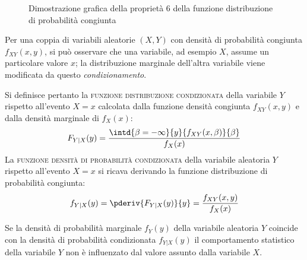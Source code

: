 \begin{figure}[!ht]
{\begin{tikzpicture}[scale=.6]
		\end{tikzpicture}
	} \hspace{3em}
	\caption{Dimostrazione grafica della proprietà 6 della funzione distribuzione di probabilità congiunta}
\end{figure}

Per una coppia di variabili aleatorie $(X,Y)$ con densità di probabilità congiunta $f_{XY}(x,y)$, si può osservare che una variabile, ad esempio $X$, assume un particolare valore $x$; la distribuzione marginale dell'altra variabile viene modificata da questo \emph{condizionamento}.

Si definisce pertanto la \textsc{funzione distribuzione condizionata} della variabile $Y$ rispetto all'evento $X=x$ calcolata dalla funzione densità congiunta $f_{XY}(x,y)$ e dalla densità marginale di $f_X(x)$:
\begin{equation}
	F_{Y|X}(y)=\frac{\intd{\beta=-\infty}{y}{f_{XY}(x,\beta)}{\beta}}{f_X(x)}
\end{equation}
La \textsc{funzione densità di probabilità condizionata} della variabile aleatoria $Y$ rispetto all'evento $X=x$ si ricava derivando la funzione distribuzione di probabilità congiunta:
\begin{equation}
	f_{Y|X}(y)=\pderiv{F_{Y|X}(y)}{y}=\frac{f_{XY}(x,y)}{f_X(x)}
\end{equation}

Se la densità di probabilità marginale $f_Y(y)$ della variabile aleatoria $Y$ coincide con la densità di probabilità condizionata $f_{Y|X}(y)$ il comportamento statistico della variabile $Y$ non è influenzato dal valore assunto dalla variabile $X$.

